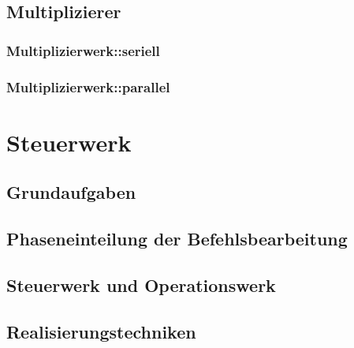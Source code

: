 \subsection{Multiplizierer}

\subsubsection{Multiplizierwerk::seriell}
\subsubsection{Multiplizierwerk::parallel}


\section{Steuerwerk}

\subsection*{Grundaufgaben}
\subsection*{Phaseneinteilung der Befehlsbearbeitung}
\subsection*{Steuerwerk und Operationswerk}
\subsection*{Realisierungstechniken}

